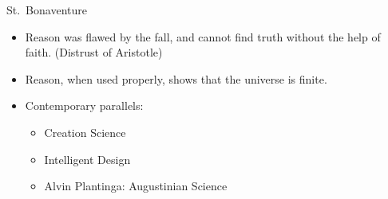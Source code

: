 \documentclass{beamer}
\begin{document}
\begin{frame}{St.\ Bonaventure}

\begin{itemize}
\item Reason was flawed by the fall, and cannot find truth without the
  help of faith.  (Distrust of Aristotle)
\item Reason, when used properly, shows that the universe is finite.
\item Contemporary parallels:
\begin{itemize}
\item Creation Science
\item Intelligent Design
\item Alvin Plantinga: Augustinian Science
\end{itemize}
\end{itemize}

\end{frame}
\end{document}
